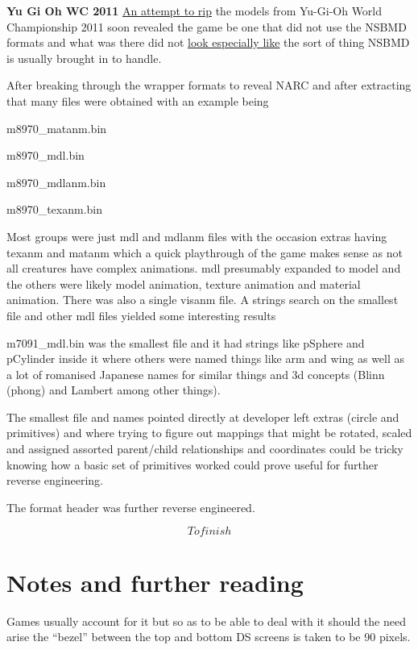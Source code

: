 \documentclass[
]{book}
\begin{document}
\textbf{Yu Gi Oh WC 2011} \href{http://gbatemp.net/topic/322715-yu-gi-oh-world-championship-2011-model-ripping/}{An attempt to rip} the models from Yu-Gi-Oh World Championship 2011 soon revealed the game be one that did not use the NSBMD formats and what was there did not \href{http://www.youtube.com/watch?\&v=ccqzbFvC3Vg}{look especially like} the sort of thing NSBMD is usually brought in to handle.

After breaking through the wrapper formats to reveal NARC and after extracting that many files were obtained with an example being

m8970\_matanm.bin

m8970\_mdl.bin

m8970\_mdlanm.bin

m8970\_texanm.bin

Most groups were just mdl and mdlanm files with the occasion extras having texanm and matanm which a quick playthrough of the game makes sense as not all creatures have complex animations. mdl presumably expanded to model and the others were likely model animation, texture animation and material animation. There was also a single visanm file. A strings search on the smallest file and other mdl files yielded some interesting results

m7091\_mdl.bin was the smallest file and it had strings like pSphere and pCylinder inside it where others were named things like arm and wing as well as a lot of romanised Japanese names for similar things and 3d concepts (Blinn (phong) and Lambert among other things).

The smallest file and names pointed directly at developer left extras (circle and primitives) and where trying to figure out mappings that might be rotated, scaled and assigned assorted parent/child relationships and coordinates could be tricky knowing how a basic set of primitives worked could prove useful for further reverse engineering.

The format header was further reverse engineered.

\[To finish\]

\hypertarget{notes-and-further-reading}{%
\section{Notes and further reading}\label{notes-and-further-reading}}

Games usually account for it but so as to be able to deal with it should the need arise the ``bezel'' between the top and bottom DS screens is taken to be 90 pixels.
\end{document}
